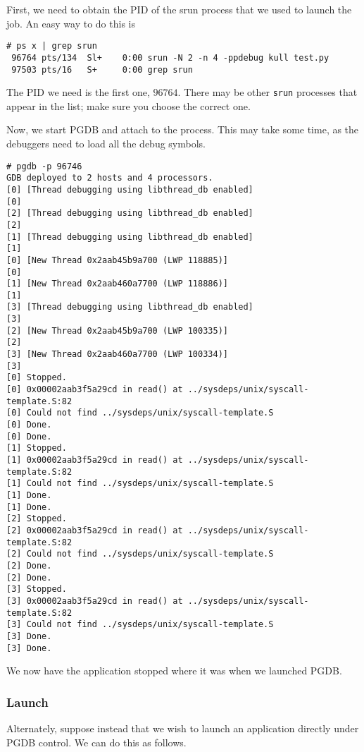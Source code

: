 \documentclass{refart}
\begin{document}
First, we need to obtain the PID of the srun process that we used to launch the job. An easy way to do this is

\begin{Verbatim}
# ps x | grep srun
 96764 pts/134  Sl+    0:00 srun -N 2 -n 4 -ppdebug kull test.py
 97503 pts/16   S+     0:00 grep srun
\end{Verbatim}

The PID we need is the first one, $96764$. There may be other \texttt{srun} processes that appear in the list; make sure you choose the correct one.

Now, we start PGDB and attach to the process. This may take some time, as the debuggers need to load all the debug symbols.

\begin{Verbatim}
# pgdb -p 96746
GDB deployed to 2 hosts and 4 processors.
[0] [Thread debugging using libthread_db enabled]
[0] 
[2] [Thread debugging using libthread_db enabled]
[2] 
[1] [Thread debugging using libthread_db enabled]
[1] 
[0] [New Thread 0x2aab45b9a700 (LWP 118885)]
[0] 
[1] [New Thread 0x2aab460a7700 (LWP 118886)]
[1] 
[3] [Thread debugging using libthread_db enabled]
[3] 
[2] [New Thread 0x2aab45b9a700 (LWP 100335)]
[2] 
[3] [New Thread 0x2aab460a7700 (LWP 100334)]
[3] 
[0] Stopped.
[0] 0x00002aab3f5a29cd in read() at ../sysdeps/unix/syscall-template.S:82
[0] Could not find ../sysdeps/unix/syscall-template.S
[0] Done.
[0] Done.
[1] Stopped.
[1] 0x00002aab3f5a29cd in read() at ../sysdeps/unix/syscall-template.S:82
[1] Could not find ../sysdeps/unix/syscall-template.S
[1] Done.
[1] Done.
[2] Stopped.
[2] 0x00002aab3f5a29cd in read() at ../sysdeps/unix/syscall-template.S:82
[2] Could not find ../sysdeps/unix/syscall-template.S
[2] Done.
[2] Done.
[3] Stopped.
[3] 0x00002aab3f5a29cd in read() at ../sysdeps/unix/syscall-template.S:82
[3] Could not find ../sysdeps/unix/syscall-template.S
[3] Done.
[3] Done.
\end{Verbatim}

We now have the application stopped where it was when we launched PGDB.

\subsubsection{Launch}

Alternately, suppose instead that we wish to launch an application directly under PGDB control. We can do this as follows.
\end{document}
